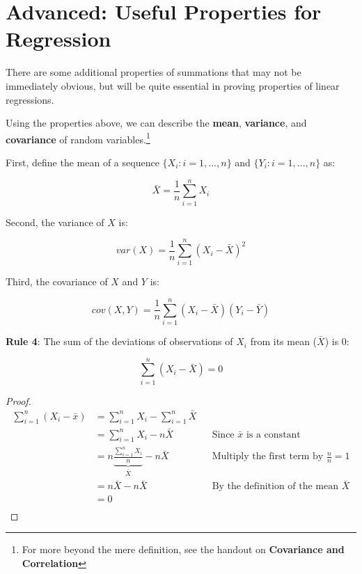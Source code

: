\documentclass{article}
\begin{document}
\clearpage 

\section{Advanced: Useful Properties for Regression}

There are some additional properties of summations that may not be immediately obvious, but will be quite essential in proving properties of linear regressions.

Using the properties above, we can describe the \textbf{mean}, \textbf{variance}, and \textbf{covariance} of random variables.\footnote{For more beyond the mere definition, see the handout on \textbf{Covariance and Correlation}}

First, define the mean of  a sequence $\{X_i: i=1,...,n\}$ and $\{Y_i: i=1,...,n\}$ as: 

\begin{equation*}
\bar{X}=\frac{1}{n}\sum^n_{i=1}X_i
\end{equation*}

Second, the variance of  $X$ is:

\begin{equation*}
var(X)=\frac{1}{n}\sum^n_{i=1}(X_i-\bar{X})^2
\end{equation*}

Third, the covariance of $X$ and $Y$ is:

\begin{equation*}
cov(X,Y)=\frac{1}{n}\sum^n_{i=1}(X_i-\bar{X})(Y_i-\bar{Y})
\end{equation*}


\textbf{Rule 4}: The sum of the deviations of observations of $X_i$ from its mean ($\bar{X}$) is 0:

\begin{equation}
	\sum^n_{i=1} (X_i-\bar{X})=0
\end{equation}

\begin{proof}
\begin{align*}
	\sum^n_{i=1} (X_i-\bar{x}) &=\sum^n_{i=1}X_i-\sum^n_{i=1}\bar{X} && \\
	&=\sum^n_{i=1}X_i-n\bar{X} && \text{Since $\bar{x}$ is a constant}\\
	&=n\underbrace{\frac{\displaystyle\sum^n_{i=1}X_i}{n}}_{\bar{X}}-n\bar{X} && \text{Multiply the first term by }\frac{n}{n}=1\\ 
	&=n\bar{X}-n\bar{X}&& \text{By the definition of the mean }\bar{X}\\
	&=0 &&  \\
\end{align*}
\end{proof}
\end{document}
